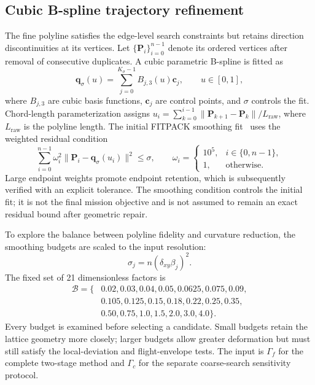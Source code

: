 \subsection{Cubic B-spline trajectory refinement}
\label{sec:bspline}

The fine polyline satisfies the edge-level search constraints but retains
direction discontinuities at its vertices. Let
$\{\mathbf P_i\}_{i=0}^{n-1}$ denote its ordered vertices after removal of
consecutive duplicates. A cubic parametric B-spline is fitted as
\begin{equation}
 \mathbf q_\sigma(u)=\sum_{j=0}^{K_\sigma-1}
 B_{j,3}(u)\mathbf c_j,\qquad u\in[0,1],
 \label{me:eq:spline}
\end{equation}
where $B_{j,3}$ are cubic basis functions, $\mathbf c_j$ are control points,
and $\sigma$ controls the fit. Chord-length parameterization assigns
$u_i=\sum_{k=0}^{i-1}\|\mathbf P_{k+1}-\mathbf P_k\|/L_{\mathrm{raw}}$,
where $L_{\mathrm{raw}}$ is the polyline length. The initial FITPACK
smoothing fit~\cite{dierckx1993} uses the weighted residual condition
\begin{equation}
 \sum_{i=0}^{n-1}\omega_i^2
       \|\mathbf P_i-\mathbf q_\sigma(u_i)\|^2\le\sigma,
 \qquad
 \omega_i=
 \begin{cases}
 10^5,&i\in\{0,n-1\},\\
 1,&\text{otherwise}.
 \end{cases}
 \label{me:eq:fit}
\end{equation}
Large endpoint weights promote endpoint retention, which is subsequently
verified with an explicit tolerance. The smoothing condition controls the
initial fit; it is not the final mission objective and is not assumed to
remain an exact residual bound after geometric repair.

To explore the balance between polyline fidelity and curvature reduction,
the smoothing budgets are scaled to the input resolution:
\begin{equation}
 \sigma_j=n(\delta_{xy}\beta_j)^2.
 \label{me:eq:budgets}
\end{equation}
The fixed set of 21 dimensionless factors is
\begin{equation}
 \begin{split}
 \mathcal B=\{&0.02,0.03,0.04,0.05,0.0625,0.075,0.09,\\
              &0.105,0.125,0.15,0.18,0.22,0.25,0.35,\\
              &0.50,0.75,1.0,1.5,2.0,3.0,4.0\}.
 \end{split}
 \label{me:eq:budgetset}
\end{equation}
Every budget is examined before selecting a candidate. Small budgets
retain the lattice geometry more closely; larger budgets allow greater
deformation but must still satisfy the local-deviation and flight-envelope
tests. The input is $\Gamma_f$ for the complete two-stage method and
$\Gamma_c$ for the separate coarse-search sensitivity protocol.

